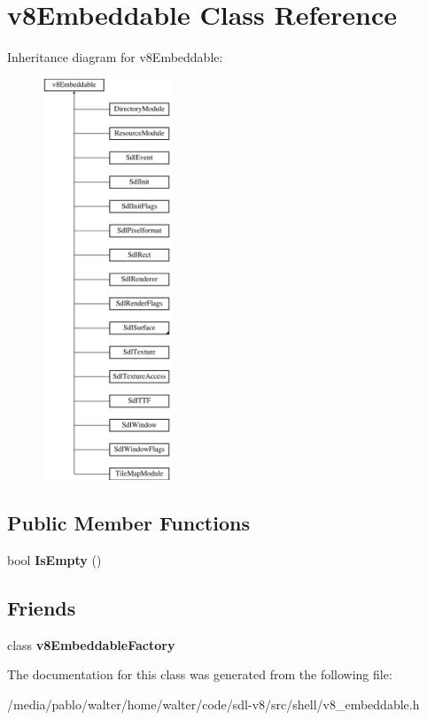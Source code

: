 \hypertarget{classv8Embeddable}{}\section{v8\+Embeddable Class Reference}
\label{classv8Embeddable}
Inheritance diagram for v8\+Embeddable\+:\begin{figure}[H]
\begin{center}
\leavevmode
\includegraphics[height=12.000000cm]{classv8Embeddable}
\end{center}
\end{figure}
\subsection*{Public Member Functions}
\begin{DoxyCompactItemize}
\item 
\mbox{\label{classv8Embeddable_a36cbb688fc3dedfd8dae5d8f9d943163}} 
bool {\bfseries Is\+Empty} ()
\end{DoxyCompactItemize}
\subsection*{Friends}
\begin{DoxyCompactItemize}
\item 
\mbox{\label{classv8Embeddable_a0925837e003dbf2a8eb2be31c139c453}} 
class {\bfseries v8\+Embeddable\+Factory}
\end{DoxyCompactItemize}


The documentation for this class was generated from the following file\+:\begin{DoxyCompactItemize}
\item 
/media/pablo/walter/home/walter/code/sdl-\/v8/src/shell/v8\+\_\+embeddable.\+h\end{DoxyCompactItemize}
